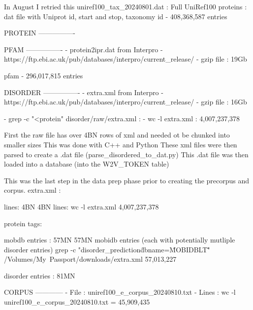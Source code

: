 \documentclass{article}
\begin{document}
In August I retried this
uniref100_tax_20240801.dat :    Full UniRef100 proteins : dat file with Uniprot id, start and stop, taxonomy id - 408,368,587 entries

PROTEIN
----------------


PFAM
----------------
- protein2ipr.dat from Interpro
- https://ftp.ebi.ac.uk/pub/databases/interpro/current_release/
- gzip file : 19Gb

pfam - 296,017,815 entries

DISORDER
----------------
- extra.xml from Interpro
- https://ftp.ebi.ac.uk/pub/databases/interpro/current_release/
- gzip file : 16Gb

- grep -c "<protein" disorder/raw/extra.xml : 
- wc -l extra.xml                           : 4,007,237,378

First the raw file has over 4BN rows of xml and needed ot be chunked into smaller sizes
This was done with C++ and Python
These xml files were then parsed to create a .dat file (parse_disordered_to_dat.py)
This .dat file was then loaded into a database (into the W2V_TOKEN table)

This was the last step in the data prep phase prior to creating the precorpus and corpus.
extra.xml : 

lines: 4BN
4BN lines: wc -l extra.xml
4,007,237,378

protein tags: 

mobdb entries : 57MN
57MN mobidb entries (each with potentially mutliple disorder entries)
grep -c "disorder_prediction\" dbname=\"MOBIDBLT\"" /Volumes/My\ Passport/downloads/extra.xml
57,013,227

disorder entries : 81MN


CORPUS
------------
- File  : uniref100_e_corpus_20240810.txt
- Lines : wc -l uniref100_e_corpus_20240810.txt = 45,909,435
\end{document}
